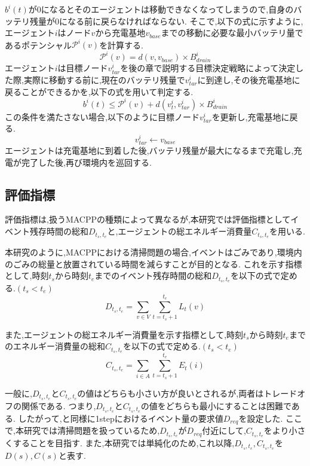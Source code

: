\documentclass[12pt,a4j,twoside]{jarticle}
\begin{document}
\par
$b^i(t)$が0になるとそのエージェントは移動できなくなってしまうので,自身のバッテリ残量が0になる前に戻らなければならない.
そこで,以下の式に示すように,エージェント$i$はノード$v$から充電基地$v_{base}$までの移動に必要な最小バッテリ量であるポテンシャル$\mathcal{P}^i(v)$を計算する.
\begin{equation}
  \mathcal{P}^i(v) = d(v, v_{base}) \times B^i_{drain}
\end{equation}
エージェント$i$は目標ノード$v^i_{tar}$を後の章で説明する目標決定戦略によって決定した際,実際に移動する前に,現在のバッテリ残量で$v^i_{tar}$に到達し,その後充電基地に戻ることができるかを,以下の式を用いて判定する.
\begin{equation}
  b^i(t) \leq \mathcal{P}^i(v) + d(v^i_t, v^i_{tar}) \times B^i_{drain}
\end{equation}
この条件を満たさない場合,以下のように目標ノード$v^i_{tar}$を更新し,充電基地に戻る.
\begin{equation}
  v^i_{tar} \gets v_{base}
\end{equation}
エージェントは充電基地に到着した後,バッテリ残量が最大になるまで充電し,充電が完了した後,再び環境内を巡回する.

\subsection{評価指標}
評価指標は,扱うMACPPの種類によって異なるが,本研究では評価指標としてイベント残存時間の総和$D_{t_s,t_e}$と,エージェントの総エネルギー消費量$C_{t_s,t_e}$を用いる.

\par
本研究のように,MACPPにおける清掃問題の場合,イベントはごみであり,環境内のごみの総量と放置されている時間を減らすことが目的となる.
これを示す指標として,時刻$t_s$から時刻$t_e$までのイベント残存時間の総和$D_{t_s,t_e}$を以下の式で定める.$(t_s < t_e)$
\begin{equation}
  D_{t_s,t_e} = \sum_{v \in V} \sum^{t_e}_{t=t_s+1} L_t(v)
\end{equation}

\par
また,エージェントの総エネルギー消費量を示す指標として,時刻$t_s$から時刻$t_e$までのエネルギー消費量の総和$C_{t_s,t_e}$を以下の式で定める.$(t_s < t_e)$
\begin{equation}
  C_{t_s,t_e} = \sum_{i \in A} \sum^{t_e}_{t=t_s+1} E_t(i)
\end{equation}

\par
一般に,$D_{t_s,t_e}$と$C_{t_s,t_e}$の値はどちらも小さい方が良いとされるが,両者はトレードオフの関係である.
つまり,$D_{t_s,t_e}$と$C_{t_s,t_e}$の値をどちらも最小にすることは困難である.
したがって,\cite{Wu2019}と同様に1stepにおけるイベント量の要求値$D_{req}$を設定した.
ここで,本研究では清掃問題を扱っているため,$D_{t_s,t_e}$が$D_{req}$付近にして,$C_{t_s,t_e}$をより小さくすることを目指す.
また,本研究では単純化のため,これ以降,$D_{t_s,t_e},C_{t_s,t_e}$を$D(s),C(s)$と表す.
\end{document}
